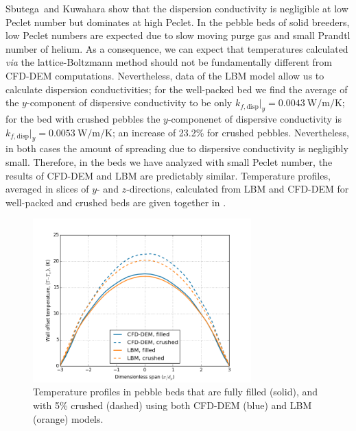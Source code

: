 Sbutega\etal~and Kuwahara\etal\cite{Sbutega2013,Kuwahara2001} show that the dispersion conductivity is negligible at low Peclet number but dominates at high Peclet. In the pebble beds of solid breeders, low Peclet numbers are expected due to slow moving purge gas and small Prandtl number of helium. As a consequence, we can expect that temperatures calculated \textit{via} the lattice-Boltzmann method should not be fundamentally different from CFD-DEM computations. Nevertheless, data of the LBM model allow us to calculate dispersion conductivities; for the well-packed bed we find the average of the $y$-component of dispersive conductivity to be only $k_{f,\text{disp}}|_y =\SI{0.0043}{\watt\per\meter\per\kelvin}$; for the bed with crushed pebbles the $y$-componenet of dispersive conductivity is $k_{f,\text{disp}}|_y =\SI{0.0053}{\watt\per\meter\per\kelvin}$; an increase of 23.2\% for crushed pebbles. Nevertheless, in both cases the amount of spreading due to dispersive conductivity is negligibly small. Therefore, in the beds we have analyzed with small Peclet number, the results of CFD-DEM and LBM are predictably similar. Temperature profiles, averaged in slices of $y$- and $z$-directions, calculated from LBM and CFD-DEM for well-packed and crushed beds are given together in .

\begin{figure}[!t]
    \centering
    \includegraphics[width = 0.75\textwidth]{figures/lbm/cfd-lbm-T-profiles}
    \caption{Temperature profiles in pebble beds that are fully filled (solid), and with 5\% crushed (dashed) using both CFD-DEM (blue) and LBM (orange) models.}\label{fig:lbm-cfd-dem-temperatures}
\end{figure}

